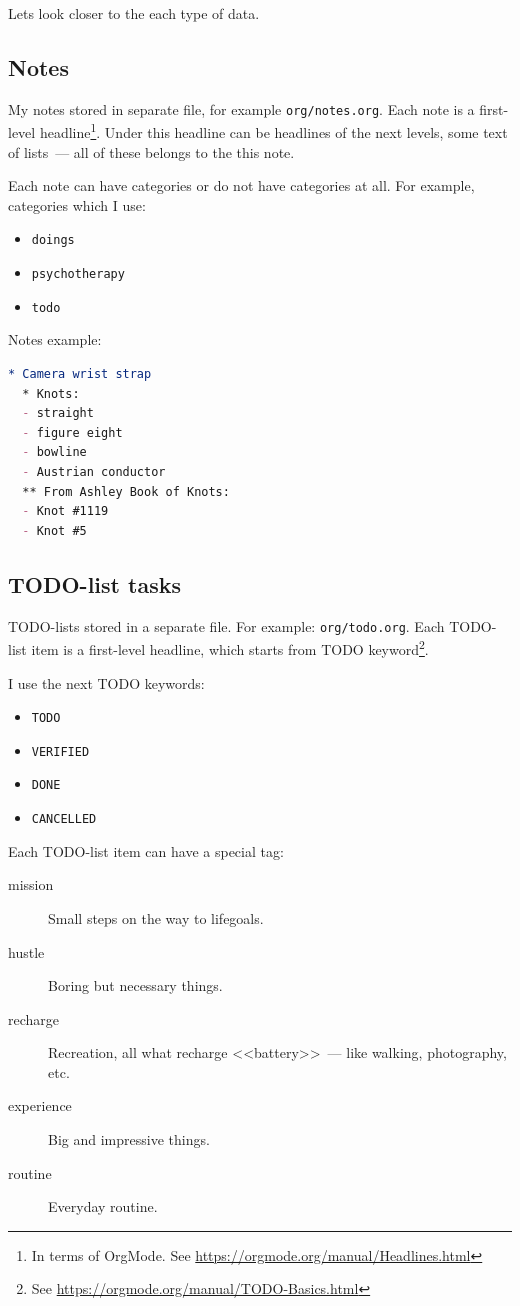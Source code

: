 \documentclass[a4paper,12pt,oneside]{scrartcl}
\begin{document}
Lets look closer to the each type of data.

\subsection{Notes}
\label{sec:notes}

My notes stored in separate file, for example \texttt{org/notes.org}. Each note
is a first-level headline\footnote{In terms of OrgMode. See
  \url{https://orgmode.org/manual/Headlines.html}}. Under this headline can be
headlines of the next levels, some text of lists~--- all of these belongs to
the this note.

Each note can have categories or do not have categories at all. For example,
categories which I use:
\begin{itemize}
\item \texttt{doings}
\item \texttt{psychotherapy}
\item \texttt{todo}
\end{itemize}

Notes example:
\begin{lstlisting}[language=org]
  * Camera wrist strap
  * Knots:
  - straight
  - figure eight
  - bowline
  - Austrian conductor
  ** From Ashley Book of Knots:
  - Knot #1119
  - Knot #5
\end{lstlisting}

\subsection{TODO-list tasks}
\label{sec:todo-list-tasks}

TODO-lists stored in a separate file. For example: \texttt{org/todo.org}. Each
TODO-list item is a first-level headline, which starts from TODO
keyword\footnote{See \url{https://orgmode.org/manual/TODO-Basics.html}}.

I use the next TODO keywords:
\begin{itemize}
\item \texttt{TODO}
\item \texttt{VERIFIED}
\item \texttt{DONE}
\item \texttt{CANCELLED}
\end{itemize}

Each TODO-list item can have a special tag:
\begin{description}
\item[mission] Small steps on the way to lifegoals.
\item[hustle] Boring but necessary things.
\item[recharge] Recreation, all what recharge <<battery>>~--- like walking,
  photography, etc.
\item[experience] Big and impressive things.
\item[routine] Everyday routine.
\end{description}
\end{document}
